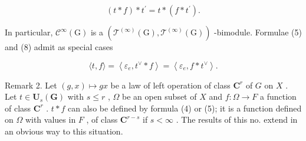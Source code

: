 \[
(t * f) * t ^ {\prime} = t * (f * t ^ {\prime}).\tag{14}
\]

In particular, \(\mathcal{C}^{\infty}(\mathrm{G})\) is a \((\mathcal{T}^{(\infty)}(\mathrm{G}),\mathcal{T}^{(\infty)}(\mathrm{G}))\) -bimodule. Formulae (5) and (8) admit as special cases

\[
\langle t, f \rangle = \left\langle \varepsilon_ {e}, t ^ {\vee} * f \right\rangle = \left\langle \varepsilon_ {e}, f * t ^ {\vee} \right\rangle .\tag{15}
\]

Remark 2. Let \((g,x)\mapsto gx\) be a law of left operation of class \(\mathbf{C}^r\) of \(G\) on \(X\) . Let \(t\in \mathbf{U}_s(\mathbf{G})\) with \(s\leqslant r\) , \(\Omega\) be an open subset of \(X\) and \(f\colon \Omega \to F\) a function of class \(\mathbf{C}^r\) . \(t*f\) can also be defined by formula (4) or (5); it is a function defined on \(\Omega\) with values in \(F\) , of class \(\mathbf{C}^{r - s}\) if \(s < \infty\) . The results of this no. extend in an obvious way to this situation.

